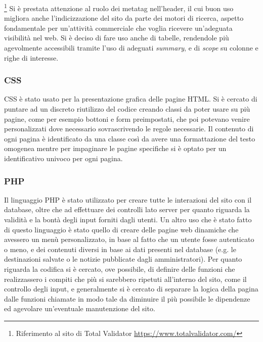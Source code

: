 \documentclass{article}
\begin{document}
			    \footnote{Riferimento al sito di Total Validator \url{https://www.totalvalidator.com/}}
			    \newline Si è prestata attenzione al ruolo dei metatag nell'header, il cui buon uso migliora anche l'indicizzazione del sito da parte dei motori di ricerca, aspetto fondamentale per un'attività commerciale che voglia ricevere un'adeguata visibilità nel web.
			    \newline Si è deciso di fare uso anche di tabelle, rendendole più agevolmente accessibili tramite l'uso di adeguati \textit{summary}, e di \textit{scope} su colonne e righe di interesse.
			\subsubsection{CSS}
				CSS è stato usato per la presentazione grafica delle pagine HTML. Si è cercato di puntare ad un discreto riutilizzo del codice creando classi da poter usare su più pagine, come per esempio bottoni e form preimpostati, che poi potevano venire personalizzati dove necessario sovrascrivendo le regole necessarie. Il contenuto di ogni pagina è identificato da una classe così da avere una formattazione del testo omogenea mentre per impaginare le pagine specifiche si è optato per un identificativo univoco per ogni pagina.
			\subsubsection{PHP}
			Il linguaggio PHP è stato utilizzato per creare tutte le interazioni del sito con il database, oltre che ad effettuare dei controlli lato server per quanto riguarda la validità e la bontà degli input forniti dagli utenti. Un altro uso che è stato fatto di questo linguaggio è stato quello di creare delle pagine web dinamiche che avessero un menù personalizzato, in base al fatto che un utente fosse autenticato o meno, e dei contenuti diversi in base ai dati presenti nel database (e.g. le destinazioni salvate o le notizie pubblicate dagli amministratori).
			Per quanto riguarda la codifica si è cercato, ove possibile, di definire delle funzioni che realizzassero i compiti che più si sarebbero ripetuti all'interno del sito, come il controllo degli input, e generalmente si è cercato di separare la logica della pagina dalle funzioni chiamate in modo tale da diminuire il più possibile le dipendenze ed agevolare un'eventuale manutenzione del sito.
\end{document}

